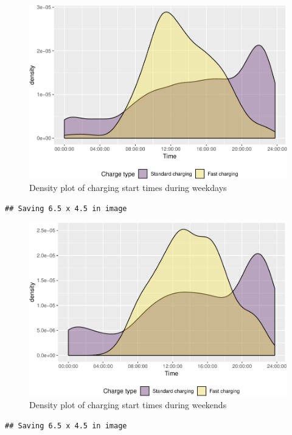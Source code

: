 \documentclass[]{article}
\begin{document}
\begin{figure}
\centering
\includegraphics{EVBB_report_files/figure-latex/chargeBeginsWeekday-1.pdf}
\caption{\label{fig:chargeBeginsWeekday}Density plot of charging start times
during weekdays}
\end{figure}

\begin{verbatim}
## Saving 6.5 x 4.5 in image
\end{verbatim}

\begin{figure}
\centering
\includegraphics{EVBB_report_files/figure-latex/chargeBeginsWeekend-1.pdf}
\caption{\label{fig:chargeBeginsWeekend}Density plot of charging start times
during weekends}
\end{figure}

\begin{verbatim}
## Saving 6.5 x 4.5 in image
\end{verbatim}
\end{document}
